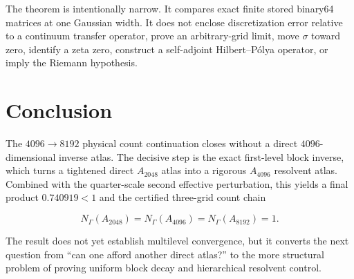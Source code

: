 \documentclass[11pt]{article}
\theoremstyle{definition}
\theoremstyle{remark}
\begin{document}
The theorem is intentionally narrow.  It compares exact finite stored
binary64 matrices at one Gaussian width.  It does not enclose discretization
error relative to a continuum transfer operator, prove an arbitrary-grid
limit, move \(\sigma\) toward zero, identify a zeta zero, construct a
self-adjoint Hilbert--P\'olya operator, or imply the Riemann hypothesis.

\section{Conclusion}

The $4096\to8192$ physical count continuation closes without a direct
$4096$-dimensional inverse atlas.  The decisive step is the exact first-level
block inverse, which turns a tightened direct $A_{2048}$ atlas into a
rigorous $A_{4096}$ resolvent atlas.  Combined with the quarter-scale second
effective perturbation, this yields a final product $0.740919<1$ and the
certified three-grid count chain

\[
N_{\Gamma}(A_{2048})=N_{\Gamma}(A_{4096})=N_{\Gamma}(A_{8192})=1.
\]

The result does not yet establish multilevel convergence, but it converts the
next question from ``can one afford another direct atlas?'' to the more
structural problem of proving uniform block decay and hierarchical resolvent
control.



\end{document}
